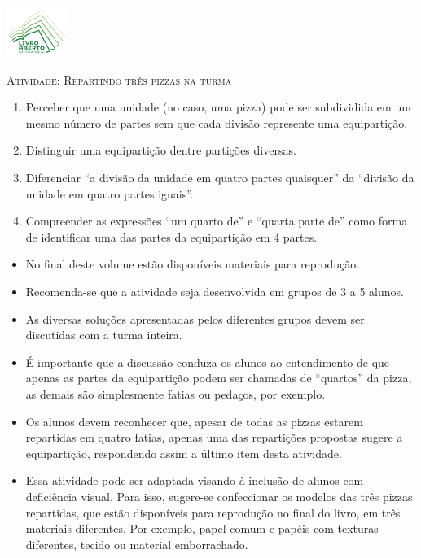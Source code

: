 \documentclass[10 pt,usenames,dvipsnames, oneside]{article}
\begin{document}
\begin{center}
  \begin{minipage}[l]{3cm}
\includegraphics[width=2cm]{logo}    
\end{minipage}\hfill
\begin{minipage}[r]{.8\textwidth}
 {\Large \scshape Atividade: Repartindo três pizzas na turma}  
\end{minipage}
\end{center}
\vspace{.2cm}

\ifdefined\prof
\begin{goals}
\begin{enumerate}

\item       Perceber que uma unidade (no caso, uma pizza) pode ser subdividida em um mesmo número de partes sem que cada divisão represente uma equipartição.
\item       Distinguir uma equipartição dentre partições diversas.
\item       Diferenciar       ``a divisão da unidade em quatro partes quaisquer'' da       ``divisão da unidade em quatro partes iguais''.
\item       Compreender as expressões ``um quarto de'' e ``quarta parte de'' como forma de identificar uma das partes da equipartição em 4 partes.
\end{enumerate}
\tcblower

  \begin{itemize} %
    \item No final deste volume estão disponíveis materiais para reprodução.
    \item Recomenda-se que a atividade seja desenvolvida em grupos de 3 a 5 alunos.
    \item As diversas soluções apresentadas pelos diferentes grupos devem ser discutidas com a turma inteira.
    \item É importante que a discussão conduza os alunos ao entendimento de que apenas as partes da equipartição podem ser chamadas de ``quartos'' da pizza, as demais são simplesmente fatias ou pedaços, por exemplo.
    \item Os alunos devem reconhecer que, apesar de todas as pizzas estarem repartidas em quatro fatias, apenas uma das repartições propostas sugere a equipartição, respondendo assim a último item desta atividade.
    \item       Essa atividade pode ser adaptada visando à inclusão de alunos com deficiência visual. Para isso, sugere-se confeccionar os modelos das três pizzas repartidas, que estão disponíveis para reprodução no final do livro, em três materiais diferentes. Por exemplo, papel comum e papéis com texturas diferentes, tecido ou material emborrachado.
\end{itemize} %

\end{goals}
\end{document}
